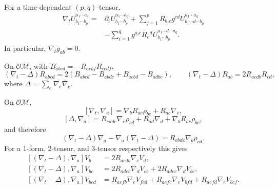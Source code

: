 \begin{lemma}
\label{lem:chow-ii-time-covariant-derivative}


For a time-dependent $(p,q)$-tensor,
\[
\begin{aligned}
 \nabla_t U^{a_1\cdots a_q}_{b_1\cdots b_p}
 ={}&\partial_tU^{a_1\cdots a_q}_{b_1\cdots b_p}
 +\sum_{j=1}^pR_{b_jc}g^{cd}U^{a_1\cdots a_q}_{b_1\cdots d\cdots b_p}\\
 &-\sum_{i=1}^qg^{a_ic}R_c{}^dU^{a_1\cdots d\cdots a_q}_{b_1\cdots b_p}.
\end{aligned}
\]
In particular, $\nabla_tg_{ab}=0$.
\end{lemma}

\begin{lemma}
\label{lem:chow-ii-frame-curvature-evolution}


On $\mathcal O\mathcal M$, with $B_{abcd}=-R_{aebf}R_{cedf}$,
\[
 (\nabla_t-\Delta)R_{abcd}
 =2(B_{abcd}-B_{abdc}+B_{acbd}-B_{adbc}),
 \qquad
 (\nabla_t-\Delta)R_{ab}=2R_{acdb}R_{cd},
\]
where $\Delta=\sum_e\nabla_e\nabla_e$.
\end{lemma}

\begin{theorem}
\label{thm:chow-ii-frame-heat-commutators}


On $\mathcal O\mathcal M$,
\[
 [\nabla_t,\nabla_a]=\nabla_bR_{ac}\rho_{bc}+R_{ac}\nabla_c,
\]
\[
 [\Delta,\nabla_a]=R_{eadc}\nabla_e\rho_{cd}+R_{ad}\nabla_d
 +\nabla_bR_{ac}\rho_{bc},
\]
and therefore
\[
 (\nabla_t-\Delta)\nabla_a-
 \nabla_a(\nabla_t-\Delta)=R_{abdc}\nabla_b\rho_{cd}.
\]
For a 1-form, 2-tensor, and 3-tensor respectively this gives
\[
\begin{aligned}
 [(\nabla_t-\Delta),\nabla_a]V_b&=2R_{acdb}\nabla_cV_d,\\
 [(\nabla_t-\Delta),\nabla_a]V_{bc}&=2R_{adeb}\nabla_dV_{ec}+2R_{adec}\nabla_dV_{be},\\
 [(\nabla_t-\Delta),\nabla_a]V_{bcd}&=R_{aefb}\nabla_eV_{fcd}+R_{aefc}\nabla_eV_{bfd}+R_{aefd}\nabla_eV_{bcf}.
\end{aligned}
\]
\end{theorem}
